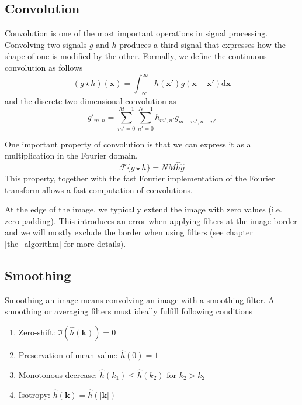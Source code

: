 		\subsection{Convolution}
		Convolution is one of the most important operations in signal processing. Convolving two signals $g$ and $h$ produces a third signal that expresses how the shape of one is modified by the other. Formally, we define the continuous convolution as follows
		\begin{equation}
			(g \star h)(\mathbf{x}) = \int_{-\infty}^{\infty} 
			h(\mathbf{x}') g(\mathbf{x} - \mathbf{x}')
			\text{d}\mathbf{x}
		\end{equation}
		and the discrete two dimensional convolution as
		\begin{equation}
			g'_{m,n} = \sum_{m'=0}^{M-1} \sum_{n'=0}^{N-1}
			h_{m',n'} g_{m-m', n-n'}
		\end{equation}
		
		One important property of convolution is that we can express it as a multiplication in the Fourier domain. 
		\begin{equation}
		\mathscr{F}\{g \star h\} = N M \hat{h} \hat{g}
		\end{equation}
		This property, together with the fast Fourier implementation of the Fourier transform allows a fast computation of convolutions. 
		
		At the edge of the image, we typically extend the image with zero values (i.e. zero padding). This introduces an error when applying filters at the image border and we will mostly exclude the border when using filters (see chapter \ref{the_algorithm} for more details).
		
		\subsection{Smoothing}\label{sect:smoothing}
		Smoothing an image means convolving an image with a smoothing filter. A smoothing or averaging filters must ideally fulfill following conditions
		\begin{enumerate}
			\item Zero-shift: $\Im (\hat{h}(\mathbf{k})) = 0$
			\item Preservation of mean value: $\hat{h}(0) = 1 $
			\item Monotonous decrease: $ \hat{h}(k_1) \leq \hat{h}(k_2) $ for $ k_2 > k_2 $
			\item Isotropy: $\hat{h}(\mathbf{k}) = \hat{h}(| \mathbf{k} |)$
		\end{enumerate}
		
